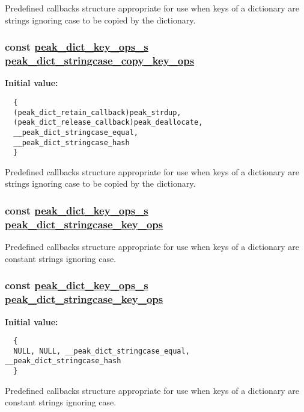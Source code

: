 Predefined callbacks structure appropriate for use when keys of a dictionary are strings ignoring case to be copied by the dictionary. \hypertarget{group__dict_ga13}{
\subsubsection[peak\_\-dict\_\-stringcase\_\-copy\_\-key\_\-ops]{\setlength{\rightskip}{0pt plus 5cm}const \hyperlink{structpeak__dict__key__ops__s}{peak\_\-dict\_\-key\_\-ops\_\-s} \hyperlink{group__dict_ga14}{peak\_\-dict\_\-stringcase\_\-copy\_\-key\_\-ops}}}
\label{group__dict_ga13}


{\bf Initial value:}

\footnotesize\begin{verbatim}
  {
  (peak_dict_retain_callback)peak_strdup,
  (peak_dict_release_callback)peak_deallocate,
  __peak_dict_stringcase_equal,
  __peak_dict_stringcase_hash
  }
\end{verbatim}\normalsize 
Predefined callbacks structure appropriate for use when keys of a dictionary are strings ignoring case to be copied by the dictionary. \hypertarget{group__dict_ga12}{
\subsubsection[peak\_\-dict\_\-stringcase\_\-key\_\-ops]{\setlength{\rightskip}{0pt plus 5cm}const \hyperlink{structpeak__dict__key__ops__s}{peak\_\-dict\_\-key\_\-ops\_\-s} \hyperlink{group__dict_ga12}{peak\_\-dict\_\-stringcase\_\-key\_\-ops}}}
\label{group__dict_ga12}


Predefined callbacks structure appropriate for use when keys of a dictionary are constant strings ignoring case. \hypertarget{group__dict_ga11}{
\subsubsection[peak\_\-dict\_\-stringcase\_\-key\_\-ops]{\setlength{\rightskip}{0pt plus 5cm}const \hyperlink{structpeak__dict__key__ops__s}{peak\_\-dict\_\-key\_\-ops\_\-s} \hyperlink{group__dict_ga12}{peak\_\-dict\_\-stringcase\_\-key\_\-ops}}}
\label{group__dict_ga11}


{\bf Initial value:}

\footnotesize\begin{verbatim}
  {
  NULL, NULL, __peak_dict_stringcase_equal, __peak_dict_stringcase_hash
  }
\end{verbatim}\normalsize 
Predefined callbacks structure appropriate for use when keys of a dictionary are constant strings ignoring case. 